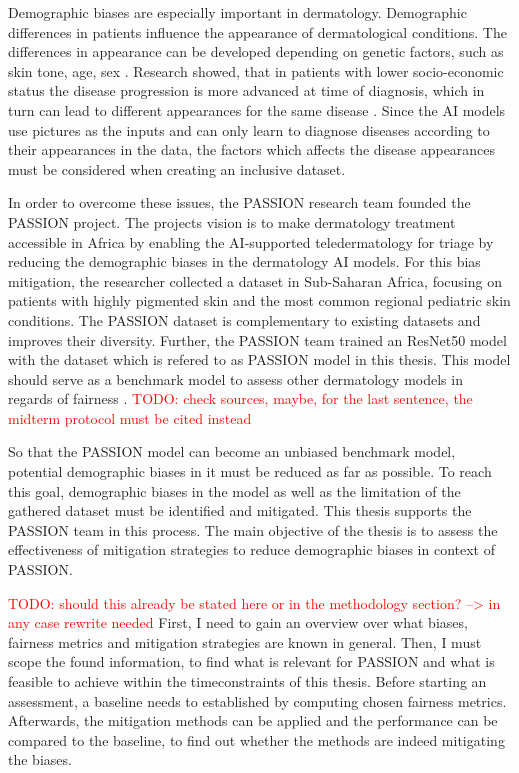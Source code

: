 \documentclass[12pt, a4paper, oneside]{book}   	%
\renewcommand{\todo}[1]{\textcolor{red}{TODO: #1}}
\begin{document}
		Demographic biases are especially important in dermatology. Demographic differences in patients influence the appearance of dermatological conditions. The differences in appearance can be developed depending on genetic factors, such as skin tone, age, sex \autocite{Diaz2022}. Research showed, that in patients with lower socio-economic status the disease progression is more advanced at time of diagnosis, which in turn can lead to different appearances for the same disease \autocite{BAD2021}. Since the AI models use pictures as the inputs and can only learn to diagnose diseases according to their appearances in the data, the factors which affects the disease appearances must be considered when creating an inclusive dataset.
		
		In order to overcome these issues, the PASSION research team founded the PASSION project. The projects vision is to make dermatology treatment accessible in Africa by enabling the AI-supported \gls{teledermatology} for triage by reducing the demographic biases in the dermatology AI models. For this bias mitigation, the researcher collected a dataset in Sub-Saharan Africa, focusing on patients with highly pigmented skin and the most common regional \gls{pediatric} skin conditions. The PASSION dataset is complementary to existing datasets and improves their diversity. Further, the PASSION team trained an ResNet50 model with the dataset which is refered to as PASSION model in this thesis. This model should serve as a benchmark model to assess other dermatology models in regards of fairness \autocite{Gottfrois2024}. \todo{check sources, maybe, for the last sentence, the midterm protocol must be cited instead}
		
		So that the PASSION model can become an unbiased benchmark model, potential demographic biases in it must be reduced as far as possible. To reach this goal, demographic biases in the model as well as the limitation of the gathered dataset must be identified and mitigated. This thesis supports the PASSION team in this process. The main objective of the thesis is to assess the effectiveness of mitigation strategies to reduce demographic biases in context of PASSION.
		
		
		\todo{should this already be stated here or in the methodology section? --> in any case rewrite needed}
		First, I need to gain an overview over what biases, fairness metrics and mitigation strategies are known in general.
		Then, I must scope the found information, to find what is relevant for PASSION and what is feasible to achieve within the timeconstraints of this thesis.
		Before starting an assessment, a baseline needs to established by computing chosen fairness metrics.
		Afterwards, the mitigation methods can be applied and the performance can be compared to the baseline, to find out whether the methods are indeed mitigating the biases.
		
\end{document}
